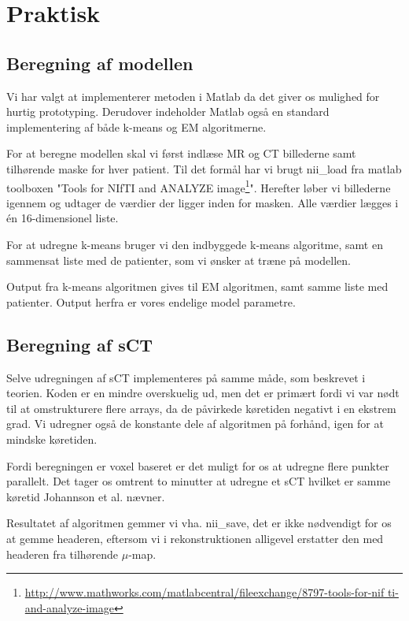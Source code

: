 \section{Praktisk}

\subsection{Beregning af modellen}

Vi har valgt at implementerer metoden i Matlab da det giver os mulighed
for hurtig prototyping. Derudover indeholder Matlab også en standard
implementering af både k-means og EM algoritmerne.

For at beregne modellen skal vi først indlæse MR og CT billederne
samt tilhørende maske for hver patient. Til det formål har vi brugt
nii\_load fra matlab toolboxen "Tools for NIfTI and ANALYZE
image\footnote{\url{http://www.mathworks.com/matlabcentral/fileexchange/8797-tools-for-nif ti-and-analyze-image}}".
Herefter løber vi billederne igennem og udtager de værdier der ligger
inden for masken. Alle værdier lægges i én 16-dimensionel liste.

For at udregne k-means bruger vi den indbyggede k-means algoritme, samt
en sammensat liste med de patienter, som vi ønsker at træne på
modellen.

Output fra k-means algoritmen gives til EM algoritmen, samt samme liste
med patienter. Output herfra er vores endelige model parametre.

\subsection{Beregning af sCT}

Selve udregningen af sCT implementeres på samme måde, som beskrevet i
teorien. Koden er en mindre overskuelig ud, men det er primært fordi
vi var nødt til at omstrukturere flere arrays, da de påvirkede
køretiden negativt i en ekstrem grad. Vi udregner også de konstante dele
af algoritmen på forhånd, igen for at mindske køretiden.

Fordi beregningen er voxel baseret er det muligt for os at udregne flere
punkter parallelt. Det tager os omtrent to minutter at udregne et sCT
hvilket er samme køretid Johannson et al. nævner.

Resultatet af algoritmen gemmer vi vha. nii\_save, det er ikke
nødvendigt for os at gemme headeren, eftersom vi i rekonstruktionen
alligevel erstatter den med headeren fra tilhørende $\mu$-map.

